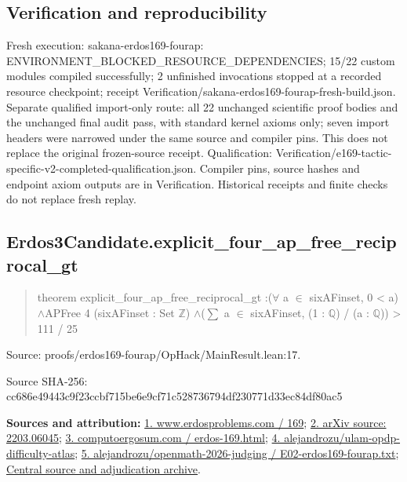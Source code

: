 \documentclass[11pt,a4paper]{article}
\begin{document}
\subsection{Verification and reproducibility}
Fresh execution: sakana-erdos169-fourap: ENVIRONMENT\_BLOCKED\_RESOURCE\_DEPENDENCIES; 15/22 custom modules compiled successfully; 2 unfinished invocations stopped at a recorded resource checkpoint; receipt Verification/sakana-erdos169-fourap-fresh-build.json. Separate qualified import-only route: all 22 unchanged scientific proof bodies and the unchanged final audit pass, with standard kernel axioms only; seven import headers were narrowed under the same source and compiler pins. This does not replace the original frozen-source receipt. Qualification: Verification/e169-tactic-specific-v2-completed-qualification.json. Compiler pins, source hashes and endpoint axiom outputs are in Verification. Historical receipts and finite checks do not replace fresh replay.

\begin{samepage}
\subsection{Erdos3Candidate.explicit\_four\_ap\_free\_reciprocal\_gt}
\begin{quote}\small\ttfamily theorem explicit\_four\_ap\_free\_reciprocal\_gt :\newline     (\ensuremath{\forall} a \ensuremath{\in} sixAFinset, 0 < a) \ensuremath{\wedge}\newline       APFree 4 (sixAFinset : Set \ensuremath{\mathbb{Z}}) \ensuremath{\wedge}\newline       (\ensuremath{\sum} a \ensuremath{\in} sixAFinset, (1 : \ensuremath{\mathbb{Q}}) / (a : \ensuremath{\mathbb{Q}})) > 111 / 25\end{quote}
{\small Source: proofs/erdos169-fourap/OpHack/MainResult.lean:17.\par}

{\small Source SHA-256: cc686e49443c9f23ccbf715be6e9cf71c528736794df230771d33ec84df80ac5\par}

{\small\textbf{Sources and attribution:} \href{https://www.erdosproblems.com/169}{1. www.erdosproblems.com / 169}; \href{https://arxiv.org/abs/2203.06045}{2. arXiv source: 2203.06045}; \href{https://computoergosum.com/en/principia/erdos-169.html}{3. computoergosum.com / erdos-169.html}; \href{https://github.com/alejandrozu/ulam-opdp-difficulty-atlas}{4. alejandrozu/ulam-opdp-difficulty-atlas}; \href{https://github.com/alejandrozu/openmath-2026-judging/blob/d0ed487f487fa7ec814ff705ab55249983fe8707/OpenMath-Judging/review/entries/E02-erdos169-fourap.txt}{5. alejandrozu/openmath-2026-judging / E02-erdos169-fourap.txt}; \href{https://github.com/alejandrozu/openmath-2026-judging}{Central source and adjudication archive}.\par}

\end{samepage}
\end{document}
